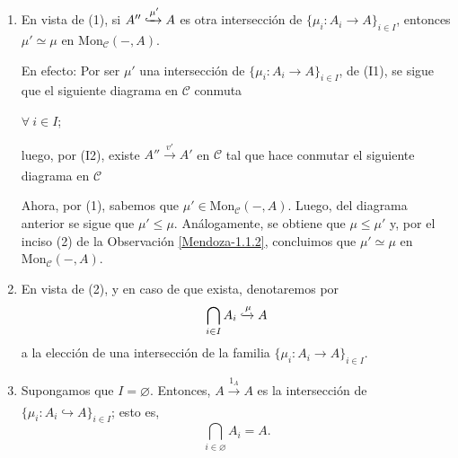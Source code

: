 \documentclass[tesis]{subfiles}
\begin{document}
\begin{Obs}
\begin{enumerate}[label=(\arabic*)]
        \item En vista de (1), si $A''\xhookrightarrow{\mu'} A$ es otra intersección de $\{\mu_i:A_i\to A\}_{i\in I}$, entonces $\mu'\simeq \mu$ en $\text{Mon}_\mathscr{C}(-,A)$. 

            En efecto: Por ser $\mu'$ una intersección de $\{\mu_i:A_i\to A\}_{i\in I}$, de (I1), se sigue que el siguiente diagrama en $\mathscr{C}$ conmuta
            \begin{center}
                \quad $\forall \ i\in I$;
            \end{center}
            luego, por (I2), existe $A''\xrightarrow[]{v'} A'$ en $\mathscr{C}$ tal que hace conmutar el siguiente diagrama en $\mathscr{C}$
            \begin{center}
            \end{center}
            Ahora, por (1), sabemos que $\mu'\in\text{Mon}_\mathscr{C}(-,A)$. Luego, del diagrama anterior se sigue que $\mu'\le\mu$. Análogamente, se obtiene que $\mu\le\mu'$ y, por el inciso (2) de la Observación \ref{Mendoza-1.1.2}, concluimos que $\mu'\simeq\mu$ en $\text{Mon}_\mathscr{C}(-,A)$.

        \item En vista de (2), y en caso de que exista, denotaremos por
            \[
            \bigcap_{i\in I}A_i\xhookrightarrow{\mu}A
            \] 
            a la elección de una intersección de la familia $\{\mu_i:A_i\to A\}_{i\in I}$.

        \item Supongamos que $I=\varnothing$. Entonces, $A\xrightarrow[]{1_A}A$ es la intersección de $\{\mu_i:A_i\hookrightarrow A\}_{i\in I}$; esto es,
            \[
            \bigcap_{i\in \varnothing}A_i = A.
            \] 


\end{enumerate}
\end{Obs}
\end{document}
